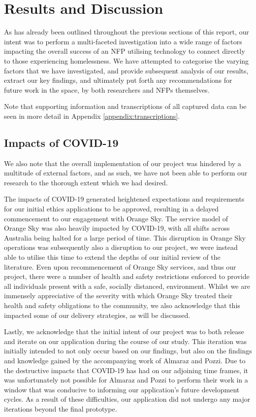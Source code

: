 \chapter{Results and Discussion}

As has already been outlined throughout the previous sections of this report, our intent was to perform a multi-faceted investigation into a wide range of factors impacting the overall success of an NFP utilising technology to connect directly to those experiencing homelessness. We have attempted to categorise the varying factors that we have investigated, and provide subsequent analysis of our results, extract our key findings, and ultimately put forth any recommendations for future work in the space, by both researchers and NFPs themselves.

Note that supporting information and transcriptions of all captured data can be seen in more detail in Appendix \ref{appendix:transcriptions}.

\section{Impacts of COVID-19}

We also note that the overall implementation of our project was hindered by a multitude of external factors, and as such, we have not been able to perform our research to the thorough extent which we had desired.

The impacts of COVID-19 generated heightened expectations and requirements for our initial ethics applications to be approved, resulting in a delayed commencement to our engagement with Orange Sky. The service model of Orange Sky was also heavily impacted by COVID-19, with all shifts across Australia being halted for a large period of time. This disruption in Orange Sky operations was subsequently also a disruption to our project, we were instead able to utilise this time to extend the depths of our initial review of the literature. Even upon recommencement of Orange Sky services, and thus our project, there were a number of health and safety restrictions enforced to provide all individuals present with a safe, socially distanced, environment. Whilst we are immensely appreciative of the severity with which Orange Sky treated their health and safety obligations to the community, we also acknowledge that this impacted some of our delivery strategies, as will be discussed.

Lastly, we acknowledge that the initial intent of our project was to both release and iterate on our application during the course of our study. This iteration was initially intended to not only occur based on our findings, but also on the findings and knowledge gained by the accompanying work of Almaraz and Pozzi. Due to the destructive impacts that COVID-19 has had on our adjoining time frames, it was unfortunately not possible for Almaraz and Pozzi to perform their work in a window that was conducive to informing our application's future development cycles. As a result of these difficulties, our application did not undergo any major iterations beyond the final prototype.

